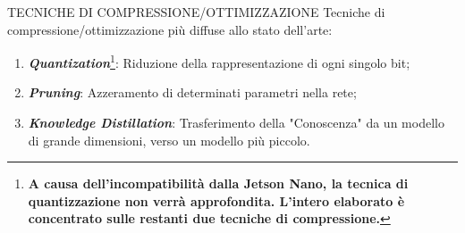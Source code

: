 \begin{frame}{TECNICHE DI COMPRESSIONE/OTTIMIZZAZIONE}
    Tecniche di compressione/ottimizzazione più diffuse allo stato dell'arte:
    \begin{enumerate}
        \item {\bfseries{\emph{Quantization}}}{\renewcommand{\thefootnote}{\fnsymbol{footnote}}\footnote[1]{\scriptsize \bfseries A causa dell'incompatibilità dalla Jetson Nano, la tecnica di quantizzazione non verrà approfondita. L'intero elaborato è concentrato sulle restanti due tecniche di compressione.}}: Riduzione della rappresentazione di ogni singolo bit;
        \item {\bfseries{\emph{Pruning}}}\footnotemark[3]: Azzeramento di determinati parametri nella rete;
        \item {\bfseries{\emph{Knowledge Distillation}}}\footnotemark[4]: Trasferimento della "Conoscenza" da un modello di grande dimensioni, verso un modello più piccolo. 
    \end{enumerate}
\end{frame}